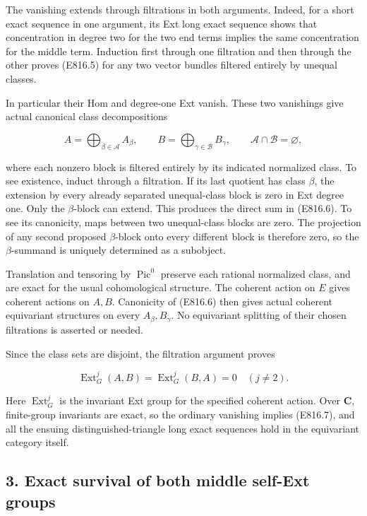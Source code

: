 The vanishing extends through filtrations in both arguments. Indeed, for
a short exact sequence in one argument, its Ext long exact sequence
shows that concentration in degree two for the two end terms implies the
same concentration for the middle term. Induction first through one
filtration and then through the other proves (E816.5) for any two vector
bundles filtered entirely by unequal classes.

In particular their Hom and degree-one Ext vanish. These two vanishings
give actual canonical class decompositions

\[
 A=\bigoplus_{\beta\in\mathcal A}A_\beta,
 \qquad
 B=\bigoplus_{\gamma\in\mathcal B}B_\gamma,
 \qquad\mathcal A\cap\mathcal B=\varnothing,
 \tag{E816.6}
\]

where each nonzero block is filtered entirely by its indicated
normalized class. To see existence, induct through a filtration. If its
last quotient has class \(\beta\), the extension by every already
separated unequal-class block is zero in Ext degree one. Only the
\(\beta\)-block can extend. This produces the direct sum in (E816.6). To
see its canonicity, maps between two unequal-class blocks are zero. The
projection of any second proposed \(\beta\)-block onto every different
block is therefore zero, so the \(\beta\)-summand is uniquely determined
as a subobject.

Translation and tensoring by \(\operatorname{Pic}^0\) preserve each
rational normalized class, and are exact for the usual cohomological
structure. The coherent action on \(E\) gives coherent actions on
\(A,B\). Canonicity of (E816.6) then gives actual coherent equivariant
structures on every \(A_\beta,B_\gamma\). No equivariant splitting of
their chosen filtrations is asserted or needed.

Since the class sets are disjoint, the filtration argument proves

\[
 \operatorname{Ext}^j_G(A,B)
   =\operatorname{Ext}^j_G(B,A)=0\quad(j\ne2).
 \tag{E816.7}
\]

Here \(\operatorname{Ext}^j_G\) is the invariant Ext group for the
specified coherent action. Over \(\mathbf C\), finite-group invariants
are exact, so the ordinary vanishing implies (E816.7), and all the
ensuing distinguished-triangle long exact sequences hold in the
equivariant category itself.

\subsection{3. Exact survival of both middle self-Ext
groups}\label{SF-E816-exact-survival-of-both-middle-self-ext-groups}

